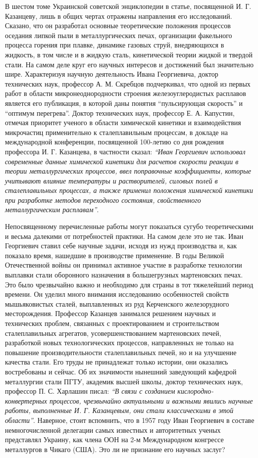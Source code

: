 В шестом томе Украинской советской энциклопедии в статье, посвященной И. Г.
Казанцеву, лишь в общих чертах отражены направления его исследований. Сказано,
что он разработал основные теоретические положения процессов оседания липкой
пыли в металлургических печах, организации факельного процесса горения при
плавке, динамике газовых струй, внедряющихся в жидкость, в том числе и в жидкую
сталь, кинетической теории жидкой и твердой стали. На самом деле круг его
научных интересов и достижений был значительно шире. Характеризуя научную
деятельность Ивана Георгиевича, доктор технических наук, профессор А. М.
Скребцов подчеркивал, что одной из первых работ в области микронеоднородности
строения железоуглеродистых расплавов является его публикация, в которой даны
понятия \enquote{пульсирующая скорость} и \enquote{оптимум перегрева}. Доктор технических наук,
профессор Е. А. Капустин, отмечая приоритет ученого в области химической
кинетики и взаимодействия микрочастиц применительно к сталеплавильным
процессам, в докладе на международной конференции, посвященной 100-летию со дня
рождения профессора И. Г. Казанцева, в частности сказал: \emph{\enquote{Иван Георгиевич
использовал современные данные химической кинетики для расчетов скорости
реакции в теории металлургических процессов, ввел поправочные коэффициенты,
которые учитывают влияние температуры и растворителей, силовых полей в
сталеплавильных процессах, а также применил положения химической кинетики при
разработке методов переходного состояния, свойственного металлургическим
расплавам}}.

Непосвященному перечисленные работы могут показаться сугубо теоретическими и
весьма далекими от потребностей практики. На самом деле это не так. Иван
Георгиевич ставил себе научные задачи, исходя из нужд производства и, как
показало время, нашедшие в производстве применение. В годы Великой
Отечественной войны он принимал активное участие в разработке технологии
выплавки стали оборонного назначения в большегрузных мартеновских печах. Это
было чрезвычайно важно и необходимо для страны в тот тяжелейший период времени.
Он уделил много внимания исследованию особенностей свойств мышьяковистых
сталей, выплавленных из руд Керченского железорудного месторождения. Профессор
Казанцев занимался решением научных и технических проблем, связанных с
проектированием и строительством сталеплавильных агрегатов, усовершенствованием
мартеновских печей, разработкой новых технологических процессов, направленных
не только на повышение производительности сталеплавильных печей, но и на
улучшение качества стали. Его труды не принадлежат только истории, они
оказались востребованы и сейчас. Об их значимости нынешний заведующий кафедрой
металлургии стали ПГТУ, академик высшей школы, доктор технических наук,
профессор П. С. Харлашин писал: \emph{\enquote{В связи с созданием кислородно-конвертерных
процессов, чрезвычайно актуальными и важными явились научные работы,
выполненные И. Г. Казанцевым, они стали классическими в этой области}}. Наверное,
стоит вспомнить, что в 1957 году Иван Георгиевич в составе немногочисленной
делегации самых известных и авторитетных ученых представлял Украину, как члена
ООН на 2-м Международном конгрессе металлургов в Чикаго (США). Это ли не
признание его научных заслуг?

